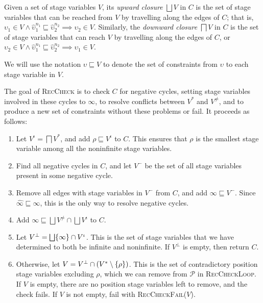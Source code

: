 \documentclass[sigplan,10pt,anonymous,review,nonacm]{acmart}
\begin{document}
Given a set of stage variables $V$, its \textit{upward closure} $\bigsqcup V$ in $C$ is the set of stage variables that can be reached from $V$ by travelling along the edges of $C$; that is, $\upsilon_1 \in V \wedge \hat{\upsilon}_1^{n_1} \sqsubseteq \hat{\upsilon}_2^{n_2} \implies \upsilon_2 \in V$. Similarly, the \textit{downward closure} $\bigsqcap V$ in $C$ is the set of stage variables that can reach $V$ by travelling along the edges of $C$, or $\upsilon_2 \in V \wedge \hat{\upsilon}_1^{n_1} \sqsubseteq \hat{\upsilon}_2^{n_2} \implies \upsilon_1 \in V$.

We will use the notation $\upsilon \sqsubseteq V$ to denote the set of constraints from $\upsilon$ to each stage variable in $V$.

The goal of \textsc{RecCheck} is to check $C$ for negative cycles, setting stage variables involved in these cycles to $\infty$, to resolve conflicts between $V^*$ and $V^\neq$, and to produce a new set of constraints without these problems or fail. It proceeds as follows:

\begin{enumerate}
    \item Let $V^\iota = \bigsqcap V^*$, and add $\rho \sqsubseteq V^\iota$ to $C$. This ensures that $\rho$ is the smallest stage variable among all the noninfinite stage variables.
    \item Find all negative cycles in $C$, and let $V^-$ be the set of all stage variables present in some negative cycle.
    \item Remove all edges with stage variables in $V^-$ from $C$, and add $\infty \sqsubseteq V^-$. Since $\widehat{\infty} \sqsubseteq \infty$, this is the only way to resolve negative cycles.
    \item Add $\infty \sqsubseteq \bigsqcup V^\neq \cap \bigsqcup V^\iota$ to $C$.
    \item Let $V^\bot = \bigsqcup \{\infty\} \cap V^\iota$. This is the set of stage variables that we have determined to both be infinite and noninfinite. If $V^\bot$ is empty, then return $C$.
    \item Otherwise, let $V = V^\bot \cap (V^* \setminus \{\rho\})$. This is the set of contradictory position stage variables excluding $\rho$, which we can remove from $\mathcal{P}$ in \textsc{RecCheckLoop}. If $V$ is empty, there are no position stage variables left to remove, and the check fails. If $V$ is not empty, fail with \textsc{RecCheckFail}($V$).
\end{enumerate}
\end{document}
